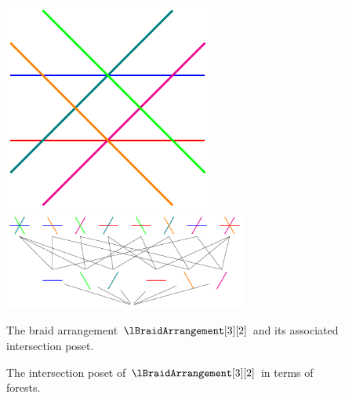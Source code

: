 \begin{figure}
\centering
\includegraphics{figures/B23.pdf}
\includegraphics[width=8cm]{figures/PosetB23.pdf}
\caption{The braid arrangement $\lBraidArrangement[3][2]$ and its associated intersection poset. \label{fig:B23}}
\end{figure}

\begin{figure}

\centering
{}
\caption{The intersection poset of $\lBraidArrangement[3][2]$ in terms of forests. \label{IntPosB23}}
\end{figure}


